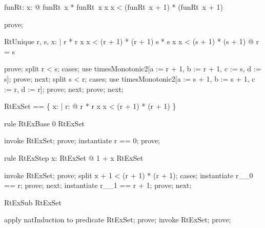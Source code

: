 \documentclass{article}
\begin{document}
\begin{axdef}
  funRt: \nat \fun \nat
\where
   \forall x: \nat @ funRt~x * funRt~x \leq x \land x < (funRt~x + 1) * (funRt~x + 1)
\end{axdef}

\begin{zproof}
prove;
\end{zproof}

\begin{theorem}{RtUnique}
  \forall r, s, x: \nat | r * r \leq x \land x < (r + 1) * (r + 1)
     \land s * s \leq x \land x < (s + 1) * (s + 1) @ r = s
\end{theorem}

\begin{zproof}
prove;
split r < s;
cases;
use timesMonotonic2[a := r + 1, b := r + 1, c := s, d := s];
prove;
next;
split s < r;
cases;
use timesMonotonic2[a := s + 1, b := s + 1, c := r, d := r];
prove;
next;
prove;
next;
\end{zproof}

\begin{zed}
  RtExSet == \{ x: \nat | \exists r: \nat @ r * r \leq x \land x < (r + 1) * (r + 1) \}
\end{zed}

\begin{theorem}{rule RtExBase}
  0 \in RtExSet
\end{theorem}

\begin{zproof}
invoke RtExSet;
prove;
instantiate r == 0;
prove;
\end{zproof}

\begin{theorem}{rule RtExStep}
  \forall x: RtExSet @ 1 + x \in RtExSet
\end{theorem}

\begin{zproof}
invoke RtExSet;
prove;
split x + 1 < (r + 1) * (r + 1);
cases;
instantiate r\_\_0 == r;
prove;
next;
instantiate r\_\_1 == r + 1;
prove;
next;
\end{zproof}

\begin{theorem}{RtExSub}
  \nat \subseteq RtExSet
\end{theorem}

\begin{zproof}
apply natInduction to predicate \nat \subseteq RtExSet;
prove;
invoke RtExSet;
prove;
\end{zproof}
\end{document}
